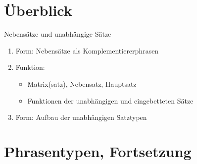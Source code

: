 % 
% 

\section{Überblick}

\begin{frame}
  {Nebensätze und unabhängige Sätze}
  \pause
  \begin{enumerate}[<+->]
    \item \alert{Form}: Nebensätze als Komplementiererphrasen
    \Halbzeile
    \item \alert{Funktion}:
    \begin{itemize}[<+->]
      \item Matrix(satz), Nebensatz, Hauptsatz
      \item Funktionen der unabhängigen und eingebetteten Sätze 
    \end{itemize}
    \item \alert{Form}: Aufbau der unabhängigen Satztypen
  \end{enumerate}
  \pause
  \Zeile
\end{frame}


\section{Phrasentypen, Fortsetzung}

